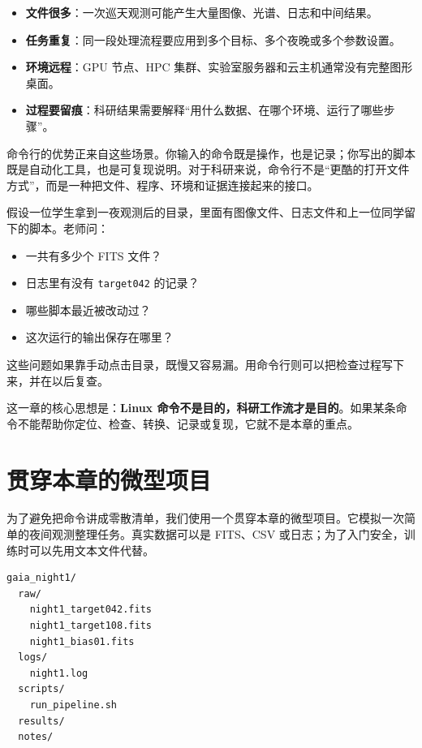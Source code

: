 \begin{itemize}
    \item \textbf{文件很多}：一次巡天观测可能产生大量图像、光谱、日志和中间结果。
    \item \textbf{任务重复}：同一段处理流程要应用到多个目标、多个夜晚或多个参数设置。
    \item \textbf{环境远程}：GPU 节点、HPC 集群、实验室服务器和云主机通常没有完整图形桌面。
    \item \textbf{过程要留痕}：科研结果需要解释“用什么数据、在哪个环境、运行了哪些步骤”。
\end{itemize}

命令行的优势正来自这些场景。你输入的命令既是操作，也是记录；你写出的脚本既是自动化工具，也是可复现说明。对于科研来说，命令行不是“更酷的打开文件方式”，而是一种把文件、程序、环境和证据连接起来的接口。

\begin{examplebox}[一个真实感很强的小问题]
假设一位学生拿到一夜观测后的目录，里面有图像文件、日志文件和上一位同学留下的脚本。老师问：
\begin{itemize}
    \item 一共有多少个 FITS 文件？
    \item 日志里有没有 \texttt{target042} 的记录？
    \item 哪些脚本最近被改动过？
    \item 这次运行的输出保存在哪里？
\end{itemize}
这些问题如果靠手动点击目录，既慢又容易漏。用命令行则可以把检查过程写下来，并在以后复查。
\end{examplebox}

这一章的核心思想是：\textbf{Linux 命令不是目的，科研工作流才是目的}。如果某条命令不能帮助你定位、检查、转换、记录或复现，它就不是本章的重点。

\section{贯穿本章的微型项目}

为了避免把命令讲成零散清单，我们使用一个贯穿本章的微型项目。它模拟一次简单的夜间观测整理任务。真实数据可以是 FITS、CSV 或日志；为了入门安全，训练时可以先用文本文件代替。

\begin{examplebox}[微型项目目录]
\begin{lstlisting}[style=terminal]
gaia_night1/
  raw/
    night1_target042.fits
    night1_target108.fits
    night1_bias01.fits
  logs/
    night1.log
  scripts/
    run_pipeline.sh
  results/
  notes/
\end{lstlisting}
\end{examplebox}

